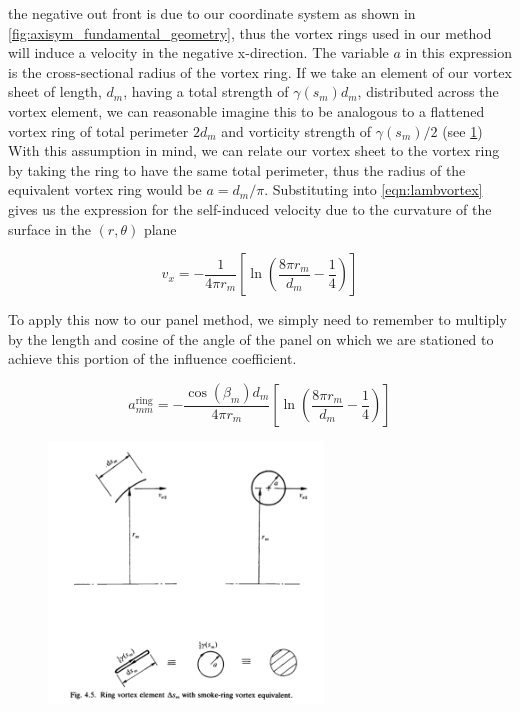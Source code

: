 \where the negative out front is due to our coordinate system as shown in \cref{fig:axisym_fundamental_geometry}, thus the vortex rings used in our method will induce a velocity in the negative x-direction.
The variable \(a\) in this expression is the cross-sectional radius of the vortex ring.
If we take an element of our vortex sheet of length, \(d_m\), having a total strength of \(\gamma(s_m)d_m\), distributed across the vortex element, we can reasonable imagine this to be analogous to a flattened vortex ring of total perimeter \(2d_m\) and vorticity strength of \(\gamma(s_m)/2\) (see \cref{fig:smokeringselfinduction})
With this assumption in mind, we can relate our vortex sheet to the vortex ring by taking the ring to have the same total perimeter, thus the radius of the equivalent vortex ring would be \(a = d_m / \pi\).
Substituting into \cref{eqn:lambvortex} gives us the expression for the self-induced velocity due to the curvature of the surface in the \((r,\theta)\) plane

\begin{equation}
    v_x = - \frac{1}{4 \pi r_m} \left[ \ln \left(\frac{8 \pi r_m}{d_m} - \frac{1}{4}\right)\right]
\end{equation}

\noindent To apply this now to our panel method, we simply need to remember to multiply by the length and cosine of the angle of the panel on which we are stationed to achieve this portion of the influence coefficient.

\begin{equation}
    a^\text{ring}_{mm} = - \frac{\cos(\beta_m)d_m}{4 \pi r_m} \left[ \ln \left(\frac{8 \pi r_m}{d_m} - \frac{1}{4}\right)\right]
\end{equation}

\begin{figure}[h!]
    \centering
    \includegraphics[width=0.65\textwidth]{./figures/smokeringselfinduction}
    \caption{}
    \label{fig:smokeringselfinduction}
\end{figure}
